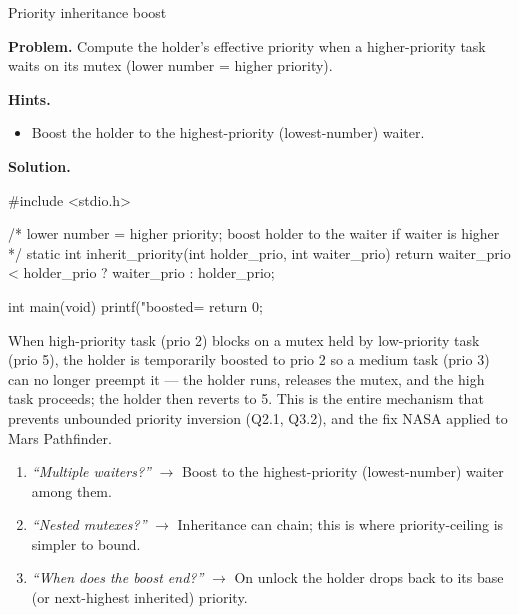 \begin{gymproblem}{Priority inheritance boost}

\textbf{Problem.} Compute the holder's effective priority when a higher-priority
task waits on its mutex (lower number = higher priority).

\textbf{Hints.}
\begin{itemize}
\item Boost the holder to the highest-priority (lowest-number) waiter.
\end{itemize}

\attempt

\textbf{Solution.}
\begin{cgym}
#include <stdio.h>

/* lower number = higher priority; boost holder to the waiter if waiter is higher */
static int inherit_priority(int holder_prio, int waiter_prio) {
    return waiter_prio < holder_prio ? waiter_prio : holder_prio;
}

int main(void) {
    printf("boosted=%
    return 0;
}
\end{cgym}

When high-priority task (prio 2) blocks on a mutex held by low-priority task
(prio 5), the holder is temporarily boosted to prio 2 so a medium task (prio 3)
can no longer preempt it --- the holder runs, releases the mutex, and the high
task proceeds; the holder then reverts to 5. This is the entire mechanism that
prevents unbounded priority inversion (Q2.1, Q3.2), and the fix NASA applied to
Mars Pathfinder.

\followups
\begin{enumerate}
\item \emph{``Multiple waiters?''} $\rightarrow$ Boost to the highest-priority
  (lowest-number) waiter among them.
\item \emph{``Nested mutexes?''} $\rightarrow$ Inheritance can chain; this is
  where priority-ceiling is simpler to bound.
\item \emph{``When does the boost end?''} $\rightarrow$ On unlock the holder
  drops back to its base (or next-highest inherited) priority.
\end{enumerate}
\end{gymproblem}

